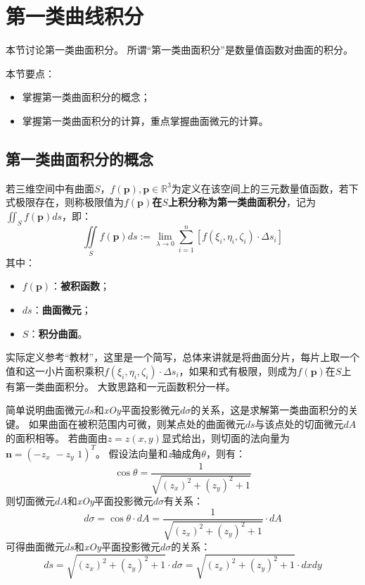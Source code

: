 \section{第一类曲线积分}

本节讨论第一类曲面积分。
所谓“第一类曲面积分”是数量值函数对曲面的积分。

本节要点：
\begin{itemize}
    \item 掌握第一类曲面积分的概念；
    \item 掌握第一类曲面积分的计算，重点掌握曲面微元的计算。
\end{itemize}

\subsection{第一类曲面积分的概念}

\begin{definition}[第一类曲面积分]
若三维空间中有曲面$S$，$f\left( \boldsymbol{p} \right) ,\boldsymbol{p}\in \mathbb{R} ^3$为定义在该空间上的三元数量值函数，若下式极限存在，则称极限值为{\bf $f\left( \boldsymbol{p} \right) $在$S$上积分称为第一类曲面积分}，记为$\iint_S{f\left( \boldsymbol{p} \right) ds}$，即：
\[
\iint\limits_S{f\left( \boldsymbol{p} \right) ds}:=\underset{\lambda \rightarrow 0}{\lim}\sum_{i=1}^n{\left[ f\left( \xi _i,\eta _i,\zeta _i \right) \cdot \Delta s_i \right]}
\]
其中：
\begin{itemize}
    \item $f\left( \boldsymbol{p} \right) $：{\bf 被积函数}；
    \item $ds$：{\bf 曲面微元}；
    \item $S$：{\bf 积分曲面}。
\end{itemize}
\end{definition}

\begin{tcolorbox}
实际定义参考“教材\cite{book1}”，这里是一个简写，总体来讲就是将曲面分片，每片上取一个值和这一小片面积乘积$f\left( \xi _i,\eta _i,\zeta _i \right) \cdot \Delta s_i$，如果和式有极限，则成为$f\left( \boldsymbol{p} \right) $在$S$上有第一类曲面积分。
大致思路和一元函数积分一样。
\end{tcolorbox}

简单说明曲面微元$ds$和{\it xOy}平面投影微元$d\sigma $的关系，这是求解第一类曲面积分的关键。
如果曲面在被积范围内可微，则某点处的曲面微元$ds$与该点处的切面微元$dA$的面积相等。
若曲面由$z=z\left( x,y \right) $显式给出，则切面的法向量为$\boldsymbol{n}=\left( -z_x\,\,-z_y\,\,1 \right) ^T$。
假设法向量和{\it z}轴成角$\theta $，则有：
\[
\cos \theta =\frac{1}{\sqrt{\left( z_x \right) ^2+\left( z_y \right) ^2+1}}
\]
则切面微元$dA$和{\it xOy}平面投影微元$d\sigma $有关系：
\[
d\sigma =\cos \theta \cdot dA=\frac{1}{\sqrt{\left( z_x \right) ^2+\left( z_y \right) ^2+1}}\cdot dA
\]
可得曲面微元$ds$和{\it xOy}平面投影微元$d\sigma $的关系：
\[
ds=\sqrt{\left( z_x \right) ^2+\left( z_y \right) ^2+1}\cdot d\sigma =\sqrt{\left( z_x \right) ^2+\left( z_y \right) ^2+1}\cdot dxdy
\]

